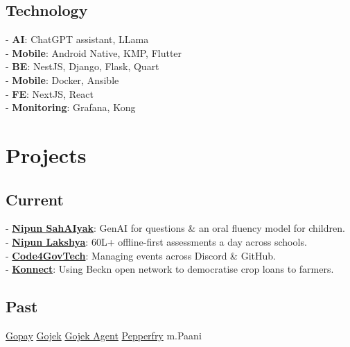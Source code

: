 \documentclass[]{deedy-resume-reversed}
\begin{document}
\begin{minipage}[t]{0.33\textwidth}
\subsection{Technology}
- {\bf AI}: ChatGPT assistant, LLama\\
- {\bf Mobile}: Android Native, KMP, Flutter \\ 
- {\bf BE}: NestJS, Django, Flask, Quart \\
- {\bf Mobile}: Docker, Ansible \\
- {\bf FE}: NextJS, React \\
- {\bf Monitoring}: Grafana, Kong \\
\sectionsep


\section{Projects}
\subsection{Current}
- \href{https://github.com/NipunSahAIyak}{{\bf Nipun SahAIyak}}: GenAI for questions \& an oral fluency model for children. \\
- \href{https://github.com/Mission-Prerna}{{\bf Nipun Lakshya}}: 60L+ offline-first assessments a day across schools. \\
- \href{https://github.com/Code4GovTech}{{\bf Code4GovTech}}: Managing events across Discord \& GitHub. \\
- \href{https://github.com/Konnect-Agri}{{\bf Konnect}}: Using Beckn open network to democratise crop loans to farmers.
\sectionsep

\subsection{Past}
\href{https://play.google.com/store/apps/details?id=com.gojek.gopay&hl=en_IN}{Gopay} \textbullet{}
\href{https://play.google.com/store/apps/details?id=com.gojek.app&hl=en_IN}{Gojek} \textbullet{}
\href{https://play.google.com/store/apps/details?id=com.gojek.agent&hl=en_IN}{Gojek Agent} \textbullet{}
\href{https://play.google.com/store/apps/details?id=com.app.pepperfry&hl=en_IN}{Pepperfry} \textbullet{}
m.Paani\\



\end{minipage}
\end{document}
